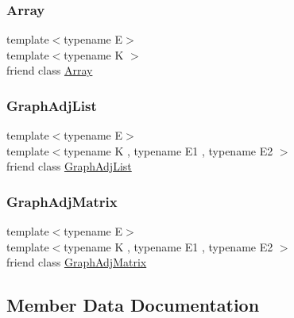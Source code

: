 \subsubsection{\texorpdfstring{Array}{Array}}
{\footnotesize\ttfamily template$<$typename E$>$ \\
template$<$typename K $>$ \\
friend class \mbox{\hyperlink{classbridges_1_1_array}{Array}}\hspace{0.3cm}{\ttfamily [friend]}}

\mbox{\label{classbridges_1_1_element_a65850138f0763fec43a76fb942f0eccc}} 
\subsubsection{\texorpdfstring{Graph\+Adj\+List}{GraphAdjList}}
{\footnotesize\ttfamily template$<$typename E$>$ \\
template$<$typename K , typename E1 , typename E2 $>$ \\
friend class \mbox{\hyperlink{classbridges_1_1_graph_adj_list}{Graph\+Adj\+List}}\hspace{0.3cm}{\ttfamily [friend]}}

\mbox{\label{classbridges_1_1_element_a1935808473b7eb8ff54149c5436c3ac9}} 
\subsubsection{\texorpdfstring{Graph\+Adj\+Matrix}{GraphAdjMatrix}}
{\footnotesize\ttfamily template$<$typename E$>$ \\
template$<$typename K , typename E1 , typename E2 $>$ \\
friend class \mbox{\hyperlink{classbridges_1_1_graph_adj_matrix}{Graph\+Adj\+Matrix}}\hspace{0.3cm}{\ttfamily [friend]}}



\subsection{Member Data Documentation}
\mbox{\label{classbridges_1_1_element_a6fb53728edc378f26238543b26238496}} 
